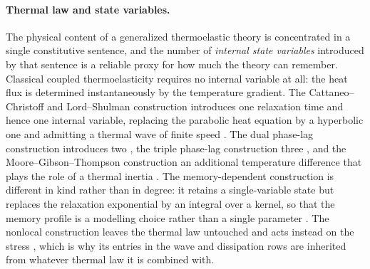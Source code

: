 \paragraph{Thermal law and state variables.}
The physical content of a generalized thermoelastic theory is concentrated in a single constitutive sentence, and the number of \emph{internal state variables} introduced by that sentence is a reliable proxy for how much the theory can remember. Classical coupled thermoelasticity requires no internal variable at all: the heat flux is determined instantaneously by the temperature gradient. The Cattaneo--Christoff and Lord--Shulman construction introduces one relaxation time and hence one internal variable, replacing the parabolic heat equation by a hyperbolic one and admitting a thermal wave of finite speed \cite{Cattaneo1948,Lord1967,Vernotte1958}. The dual phase-lag construction introduces two \cite{Tzou1995}, the triple phase-lag construction three \cite{Tzou1997}, and the Moore--Gibson--Thompson construction an additional temperature difference that plays the role of a thermal inertia \cite{Quintanilla2019}. The memory-dependent construction is different in kind rather than in degree: it retains a single-variable state but replaces the relaxation exponential by an integral over a kernel, so that the memory profile is a modelling choice rather than a single parameter \cite{Wang2011}. The nonlocal construction leaves the thermal law untouched and acts instead on the stress \cite{Eringen1972}, which is why its entries in the wave and dissipation rows are inherited from whatever thermal law it is combined with.

